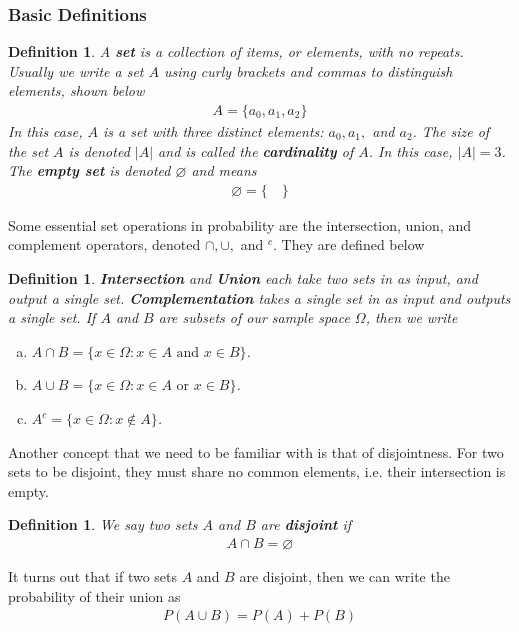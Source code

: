 \documentclass[11pt,letterpaper]{article}
\numberwithin{theorem}{section}
\newtheorem{definition}[theorem]{Definition}
\numberwithin{definition}{section}
\numberwithin{lemma}{section}
\numberwithin{corollary}{section}
\numberwithin{proposition}{section}
\theoremstyle{definition}
\numberwithin{remark}{section}
\numberwithin{claim}{section}
\numberwithin{observation}{section}
\numberwithin{fact}{section}
\numberwithin{assumption}{section}
\numberwithin{example}{section}
\numberwithin{exercise}{section}
\begin{document}
\subsubsection{Basic Definitions}

\begin{definition}
A \textbf{set} is a collection of items, or elements, with no repeats. Usually we write a set $A$ using curly brackets and commas to distinguish elements, shown below
\begin{align*}
A = \{a_0, a_1, a_2\}
\end{align*}
In this case, $A$ is a set with three distinct elements: $a_0, a_1,$ and $a_2$. The size of the set $A$ is denoted $|A|$ and is called the \textbf{cardinality} of $A$. In this case, $|A| = 3$. The \textbf{empty set} is denoted $\varnothing$ and means
\begin{align*}
\varnothing = \{\hspace{1em}\}
\end{align*}
\end{definition}

Some essential set operations in probability are the intersection, union, and complement operators, denoted $\cap, \cup,$ and $^c$. They are defined below
\begin{definition}
\textbf{Intersection} and \textbf{Union} each take two sets in as input, and output a single set. \textbf{Complementation} takes a single set in as input and outputs a single set. If $A$ and $B$ are subsets of our sample space $\Omega$, then we write
\begin{enumerate}[(a)]
\item $A \cap B = \{x \in \Omega : x \in A \text{ and } x \in B\}$. 

\item $A \cup B = \{x \in \Omega : x \in A \text{ or } x \in B\}$.

\item $A^c = \{x \in \Omega : x \notin A\}$.
\end{enumerate}
\end{definition}

Another concept that we need to be familiar with is that of disjointness. For two sets to be disjoint, they must share no common elements, i.e. their intersection is empty.
\begin{definition}
We say two sets $A$ and $B$ are \textbf{disjoint} if
\begin{align*}
A \cap B = \varnothing
\end{align*}
\end{definition}
It turns out that if two sets $A$ and $B$ are disjoint, then we can write the probability of their union as
\begin{align*}
P(A \cup B) = P(A) + P(B)
\end{align*}
\end{document}
